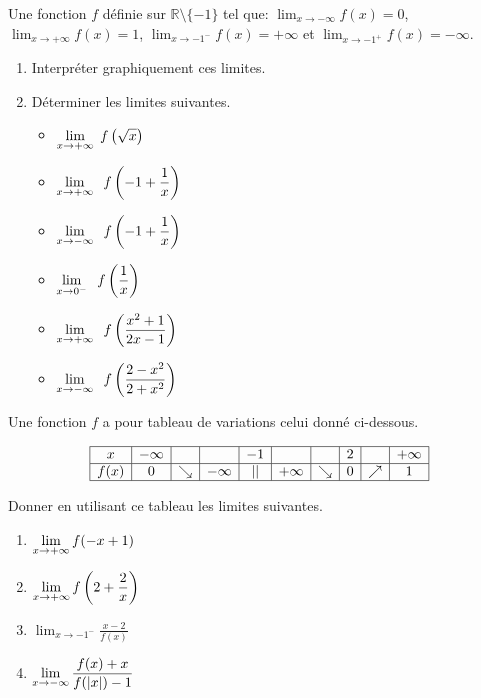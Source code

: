 \begin{exercice}
Une fonction $ f $ définie sur $\mathbb{R}\setminus\{-1\} $ tel que: $\displaystyle \lim_{x \to -\infty}f(x)=0 $,  $ \displaystyle\lim_{x \to +\infty}f(x)=1$,  $ \lim_{x \to -1^{-}}f(x)=+\infty $  et  $ \displaystyle\lim_{x \to -1^{+}}f(x)=-\infty $. 
\begin{enumerate}
\item Interpréter graphiquement ces  limites.
\item Déterminer les limites suivantes.
\begin{itemize}
\item $\displaystyle \lim_{x \to+\infty}\; f\left(\sqrt{x}\right)$
\item $\displaystyle \lim_{x \to +\infty}\;\;f\left(-1+\frac{1}{x}\right)$
\item $\displaystyle \lim_{x \to -\infty}\;\;f\left(-1+\frac{1}{x}\right)$

\item $\displaystyle \lim_{x \to 0^{-}}\;\;f\left(\frac{1}{x}\right)$
\item $ \displaystyle\lim_{x \to +\infty}\;\;f\left(\frac{x^2+1}{2x-1}\right)$
\item $ \displaystyle\lim_{x \to -\infty}\;\;f\left(\frac{2-x^2}{2+x^2}\right)$
\end{itemize}

\end{enumerate}
\end{exercice}
\begin{exercice}
Une fonction $ f $ a pour tableau de variations celui donné ci-dessous.
\begin{center}
$$
\begin{array}{|c|c|c|c|c|c|c|c|c|c|}
\hline
x & -\infty & & & -1 & & & 2 & & +\infty \\
\hline
f(x) & 0 & \searrow & -\infty & || & +\infty & \searrow & 0 & \nearrow & 1 \\
\hline
\end{array}
$$
\end{center}


 Donner en utilisant ce tableau les limites suivantes.
\begin{enumerate}
\item $ \displaystyle\lim_{x \to +\infty}f(-x+1)$\item $ \displaystyle\lim_{x \to +\infty}f\left(2+\frac{2}{x}\right)$ \item $\displaystyle \lim_{x \to -1^-}\frac{x-2}{f(x)}$  \item $\displaystyle \lim_{x \to -\infty}\frac{f(x)+x}{f(|x|)-1}$ 
\end{enumerate}
\end{exercice}


